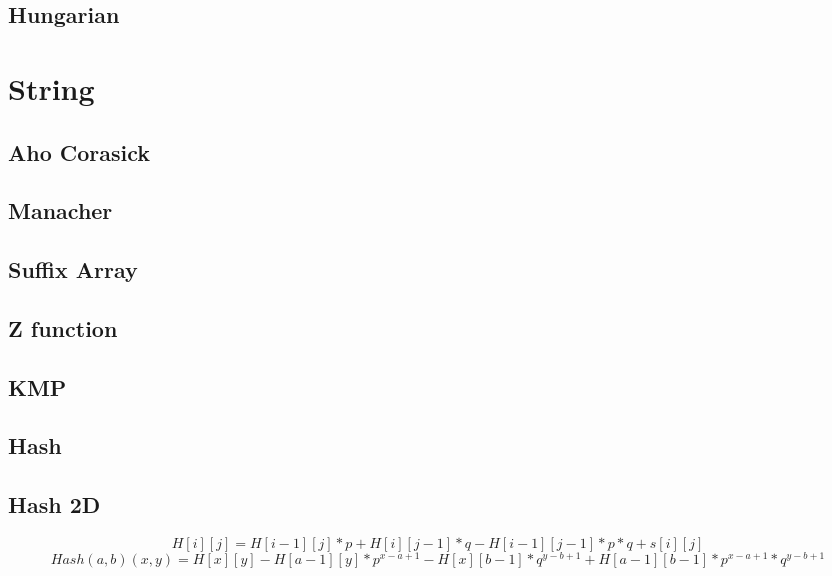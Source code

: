 \documentclass[A4 paper, 12pt, oneside, landscape]{article}
\begin{document}
\begin{multicols}{2}
	\subsection{Hungarian}
	
	
\section{String}
	\subsection{Aho Corasick}
	
	
	\subsection{Manacher}
	
	
	\subsection{Suffix Array}
	
	
	\subsection{Z function}
	
	
	\subsection{KMP}
	
	
	\subsection{Hash}
	
	
	\subsection{Hash 2D}
	\begin{dmath}
	H[i][j] = H[i - 1][j] * p + H[i][j - 1] * q - H[i - 1][j - 1] * p * q + s[i][j]
	\end{dmath}
	\begin{dmath}
	Hash(a,b)(x,y) = H[x][y] - H[a - 1][y]*p^{x - a + 1} - H[x][b - 1]*q^{y - b + 1} + H[a - 1][b - 1] * p^{x - a + 1} * q^{y - b + 1}
	\end{dmath}


\end{multicols}
\end{document}
